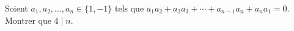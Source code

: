 Soient $a_1, a_2, \ldots, a_n \in \{1, -1\}$ tels que $a_1a_2 + a_2a_3 + \cdots + a_{n-1}a_n + a_na_1 = 0$. Montrer que $4 \mid n$.
